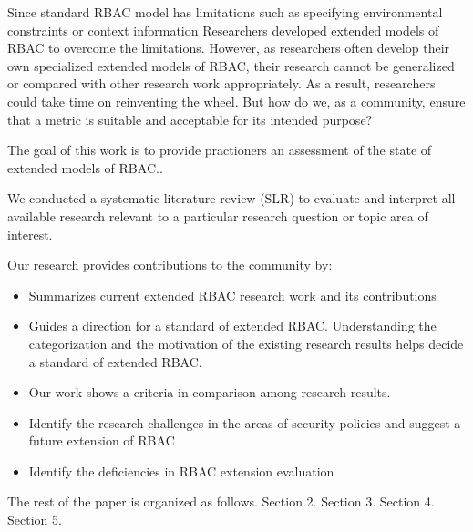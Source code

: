 Since standard RBAC model has limitations such as specifying environmental constraints or context information
Researchers developed extended models of RBAC to overcome the limitations.
However, as researchers often develop their own specialized extended models of RBAC,
their research cannot be generalized or compared with other research work appropriately.
As a result, researchers could take time on reinventing the wheel.
But how do we, as a community, ensure that a metric is suitable and acceptable for its intended purpose?

The goal of this work is to provide practioners an assessment of the state of extended models of RBAC..

We conducted a systematic literature review (SLR) to evaluate and interpret all available research relevant to a particular research question or topic area of interest.

Our research provides contributions to the community by:

\begin{itemize}
\item Summarizes current extended RBAC research work and its contributions
\item Guides a direction for a standard of extended RBAC. Understanding the categorization and the motivation of the existing research results helps decide a standard of extended RBAC.
\item Our work shows a criteria in comparison among research results.
\item Identify the research challenges in the areas of security policies and suggest a future extension of RBAC
\item Identify the deficiencies in RBAC extension evaluation
\end{itemize}

The rest of the paper is organized as follows.  Section 2. Section 3. Section 4. Section 5.
